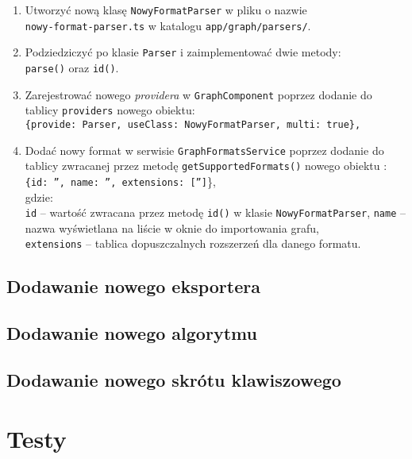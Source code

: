 \begin{enumerate}
\setlength\itemsep{0em}
\item Utworzyć nową klasę \texttt{NowyFormatParser} w pliku o nazwie \\ \texttt{nowy-format-parser.ts} w katalogu \texttt{app/graph/parsers/}.

\item Podziedziczyć po klasie \texttt{Parser} i zaimplementować dwie metody: \\ \texttt{parse()} oraz \texttt{id()}.

\item Zarejestrować nowego \textit{providera} w \texttt{GraphComponent} poprzez dodanie do tablicy \texttt{providers} nowego obiektu:\\
\texttt{\{provide: Parser, useClass: NowyFormatParser, multi: true\},}

\item Dodać nowy format w serwisie \texttt{GraphFormatsService} poprzez dodanie do tablicy zwracanej przez metodę \texttt{getSupportedFormats()} nowego obiektu : \\
\texttt{\{id: '', name: '', extensions: ['']}\}, \\ 
gdzie: \\
\texttt{id} -- wartość zwracana przez metodę \texttt{id()} w klasie \texttt{NowyFormatParser}, \texttt{name} -- nazwa wyświetlana na liście w oknie do importowania grafu,\\ \texttt{extensions} -- tablica dopuszczalnych rozszerzeń dla danego formatu.
\end{enumerate}

\subsection*{Dodawanie nowego eksportera}

\subsection*{Dodawanie nowego algorytmu}

\subsection*{Dodawanie nowego skrótu klawiszowego}

\section{Testy}\label{sec:tests}

